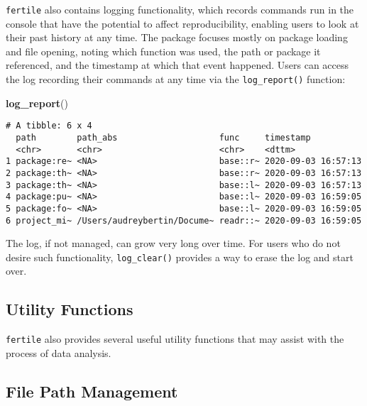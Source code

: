 \documentclass[12pt,twoside]{reedthesis}
\newenvironment{Shaded}{\begin{snugshade}}{\end{snugshade}}
\newcommand{\KeywordTok}[1]{\textcolor[rgb]{0.13,0.29,0.53}{\textbf{#1}}}
\newcommand{\NormalTok}[1]{#1}
\begin{document}
\texttt{fertile} also contains logging functionality, which records
commands run in the console that have the potential to affect
reproducibility, enabling users to look at their past history at any
time. The package focuses mostly on package loading and file opening,
noting which function was used, the path or package it referenced, and
the timestamp at which that event happened. Users can access the log
recording their commands at any time via the \texttt{log\_report()}
function:
\begin{Shaded}
\begin{Highlighting}[]
\KeywordTok{log_report}\NormalTok{()}
\end{Highlighting}
\end{Shaded}
\begin{verbatim}
# A tibble: 6 x 4
  path        path_abs                    func     timestamp          
  <chr>       <chr>                       <chr>    <dttm>             
1 package:re~ <NA>                        base::r~ 2020-09-03 16:57:13
2 package:th~ <NA>                        base::r~ 2020-09-03 16:57:13
3 package:th~ <NA>                        base::l~ 2020-09-03 16:57:13
4 package:pu~ <NA>                        base::l~ 2020-09-03 16:59:05
5 package:fo~ <NA>                        base::l~ 2020-09-03 16:59:05
6 project_mi~ /Users/audreybertin/Docume~ readr::~ 2020-09-03 16:59:05
\end{verbatim}
The log, if not managed, can grow very long over time. For users who do
not desire such functionality, \texttt{log\_clear()} provides a way to
erase the log and start over.

\subsection{Utility Functions}\label{utility-functions}

\texttt{fertile} also provides several useful utility functions that may
assist with the process of data analysis.

\subsection{File Path Management}\label{file-path-management}
\end{document}

